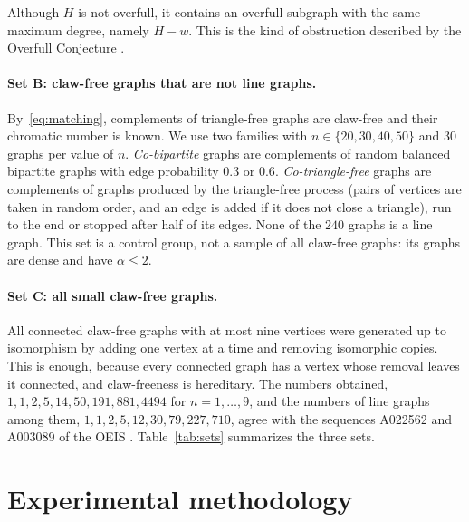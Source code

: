 \documentclass[11pt,a4paper]{article}
\begin{document}
\noindent
Although $H$ is not overfull, it contains an overfull subgraph with the same
maximum degree, namely $H-w$. This is the kind of obstruction described by the
Overfull Conjecture \cite{cao2022}.

\paragraph{Set B: claw-free graphs that are not line graphs.}
By~\eqref{eq:matching}, complements of triangle-free graphs are claw-free and
their chromatic number is known. We use two families with
$n\in\{20,30,40,50\}$ and $30$ graphs per value of $n$. \emph{Co-bipartite}
graphs are complements of random balanced bipartite graphs with edge
probability $0.3$ or $0.6$. \emph{Co-triangle-free} graphs are complements of
graphs produced by the triangle-free process (pairs of vertices are taken in
random order, and an edge is added if it does not close a triangle), run to the
end or stopped after half of its edges. None of the $240$ graphs is a line
graph. This set is a control group, not a sample of all claw-free graphs: its
graphs are dense and have $\alpha\le 2$.

\paragraph{Set C: all small claw-free graphs.}
All connected claw-free graphs with at most nine vertices were generated up to
isomorphism by adding one vertex at a time and removing isomorphic copies. This
is enough, because every connected graph has a vertex whose removal leaves it
connected, and claw-freeness is hereditary. The numbers obtained,
$1,1,2,5,14,50,191,881,4494$ for $n=1,\dots,9$, and the numbers of line graphs
among them, $1,1,2,5,12,30,79,227,710$, agree with the sequences A022562 and
A003089 of the OEIS \cite{oeis}. Table~\ref{tab:sets} summarizes the three sets.

\begin{table}[!tb]
\centering\small
\caption{Test sets; $n$ and $m$ refer to the colored graph $G$. In set A only the
parameter combinations described in the text were generated.}
\label{tab:sets}

\end{table}

\section{Experimental methodology}
\end{document}
